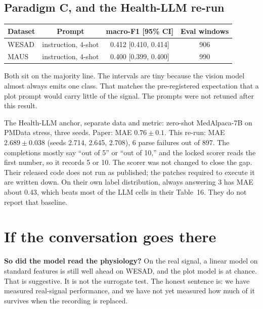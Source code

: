 \documentclass[11pt]{article}
\newcommand{\say}[1]{{\color{Ask}\textbf{#1}}}
\begin{document}
\subsection{Paradigm C, and the Health-LLM re-run}

\begin{center}
{\small
\begin{tabular}{@{}lccc@{}}
\toprule
\rowcolor{TableHead}
\textbf{Dataset} & \textbf{Prompt} & \textbf{macro-F1 [95\% CI]} & \textbf{Eval windows} \\
\midrule
WESAD & instruction, 4-shot & 0.412 [0.410, 0.414] & 906 \\
MAUS & instruction, 4-shot & 0.400 [0.399, 0.400] & 990 \\
\bottomrule
\end{tabular}
}
\end{center}

Both sit on the majority line. The intervals are tiny because the vision model almost always emits one class. That matches the pre-registered expectation that a plot prompt would carry little of the signal. The prompts were not retuned after this result.

The Health-LLM anchor, separate data and metric: zero-shot MedAlpaca-7B on PMData stress, three seeds. Paper: MAE $0.76 \pm 0.1$. This re-run: MAE $\mathbf{2.689 \pm 0.038}$ (seeds 2.714, 2.645, 2.708), 6 parse failures out of 897. The completions mostly say ``out of 5'' or ``out of 10,'' and the locked scorer reads the first number, so it records 5 or 10. The scorer was not changed to close the gap. Their released code does not run as published; the patches required to execute it are written down. On their own label distribution, always answering 3 has MAE about 0.43, which beats most of the LLM cells in their Table~16. They do not report that baseline.

\section{If the conversation goes there}

\say{So did the model read the physiology?}
On the real signal, a linear model on standard features is still well ahead on WESAD, and the plot model is at chance. That is suggestive. It is not the surrogate test. The honest sentence is: we have measured real-signal performance, and we have not yet measured how much of it survives when the recording is replaced.
\end{document}
